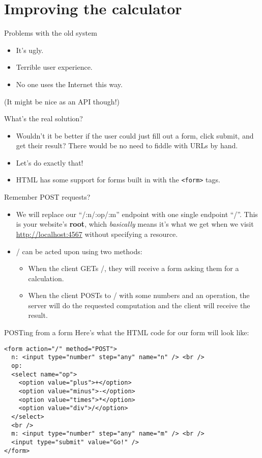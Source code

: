 \section{Improving the calculator}

\begin{frame}{Problems with the old system}
\begin{itemize}
    \item It's ugly.
    \item Terrible user experience.
    \item No one uses the Internet this way.
\end{itemize}
(It might be nice as an API though!)
\end{frame}

\begin{frame}{What's the real solution?}
\begin{itemize}
    \item Wouldn't it be better if the user could just fill out a form, click submit, and get their result? There would be no need to fiddle with URLs by hand.
    \item Let's do exactly that!
    \item HTML has some support for forms built in with the \texttt{<form>} tags.
\end{itemize}
\end{frame}

\begin{frame}{Remember POST requests?}
\begin{itemize}
    \item We will replace our ``/:n/:op/:m'' endpoint with one single endpoint ``/''. This is your website's \textbf{root}, which \textit{basically} means it's what we get when we visit \url{http://localhost:4567} without specifying a resource.
    \item / can be acted upon using two methods:
    \begin{itemize}
        \item When the client GETs /, they will receive a form asking them for a calculation.
        \item When the client POSTs to / with some numbers and an operation, the server will do the requested computation and the client will receive the result.
    \end{itemize}
\end{itemize}
\end{frame}

\begin{frame}[fragile]{POSTing from a form}
Here's what the HTML code for our form will look like:
\begin{verbatim}
<form action="/" method="POST">
  n: <input type="number" step="any" name="n" /> <br />
  op:
  <select name="op">
    <option value="plus">+</option>
    <option value="minus">-</option>
    <option value="times">*</option>
    <option value="div">/</option>
  </select>
  <br />
  m: <input type="number" step="any" name="m" /> <br />
  <input type="submit" value="Go!" />
</form>
\end{verbatim}
\end{frame}

